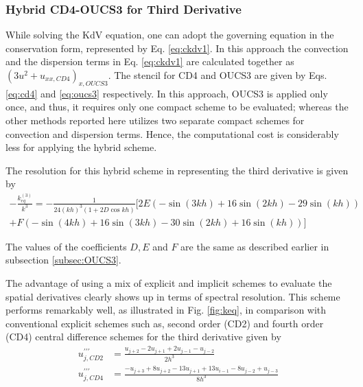 \subsubsection{Hybrid CD4-OUCS3 for Third Derivative}
While solving the KdV equation, one can adopt the governing equation in the conservation form, represented by Eq. \eqref{eq:ckdv1}. In this approach the convection and the dispersion terms in Eq. \eqref{eq:ckdv1} are calculated together as $\left(3 u^2 + u_{xx,CD4}\right)_{x,OUCS3}$. The stencil for CD4 and OUCS3 are given by Eqs. \eqref{eq:cd4} and \eqref{eq:oucs3} respectively. In this approach, OUCS3 is applied only once, and thus, it requires only one compact scheme to be evaluated; whereas the other methods reported here utilizes two separate compact schemes for convection and dispersion terms. Hence, the computational cost is considerably less for applying the hybrid scheme.

The resolution for this hybrid scheme in representing the third derivative is given by
\begin{equation}
\begin{aligned}
-\frac{k_{eq}^{(3)}}{k^{3}}=-\frac{1}{24(kh)^{3}(1+2D \cos{kh})} \bigl[ 2E\left(-\sin(3kh)+16\sin(2kh)-29\sin(kh)\right)\\
                            + F\left(-\sin(4kh)+16\sin(3kh)-30\sin(2kh)+16\sin(kh)\right)\bigr]
\end{aligned}
\end{equation}

The values of the coefficients $D,E$ and $F$ are the same as described earlier in subsection \ref{subsec:OUCS3}.

The advantage of using a mix of explicit and implicit schemes to evaluate the spatial derivatives clearly shows up in terms of spectral resolution. This scheme performs remarkably well, as illustrated in Fig. \ref{fig:keq}, in comparison with conventional explicit schemes such as, second order (CD2) and fourth order (CD4) central difference schemes for the third derivative given by
\begin{align}
u^{\prime\prime\prime}_{j,CD2}&=\frac{u_{j+2}-2u_{j+1}+2u_{j-1}-u_{j-2}}{2h^{3}}\\
u^{\prime\prime\prime}_{j,CD4}&=\frac{-u_{j+3} +8u_{j+2} - 13u_{j+1} + 13u_{i-1} - 8u_{j-2} + u_{j-3}}{8h^3}
\end{align}

